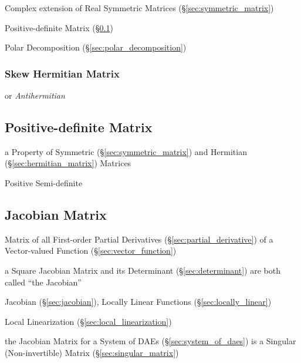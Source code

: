 Complex extension of Real Symmetric Matrices (\S\ref{sec:symmetric_matrix})

Positive-definite Matrix (\S\ref{sec:positive_definite})

Polar Decomposition (\S\ref{sec:polar_decomposition})



\subsubsection{Skew Hermitian Matrix}\label{sec:skew_hermitian}

or \emph{Antihermitian}



\subsection{Positive-definite Matrix}\label{sec:positive_definite}

a Property of Symmetric (\S\ref{sec:symmetric_matrix}) and Hermitian
(\S\ref{sec:hermitian_matrix}) Matrices

Positive Semi-definite



\subsection{Jacobian Matrix}\label{sec:jacobian_matrix}


Matrix of all First-order Partial Derivatives (\S\ref{sec:partial_derivative})
of a Vector-valued Function (\S\ref{sec:vector_function})

a Square Jacobian Matrix and its Determinant (\S\ref{sec:determinant}) are both
called ``the Jacobian''

Jacobian (\S\ref{sec:jacobian}),
Locally Linear Functions (\S\ref{sec:locally_linear})

\fist Local Linearization (\S\ref{sec:local_linearization})

\fist the Jacobian Matrix for a System of DAEs (\S\ref{sec:system_of_daes}) is
a Singular (Non-invertible) Matrix (\S\ref{sec:singular_matrix})



